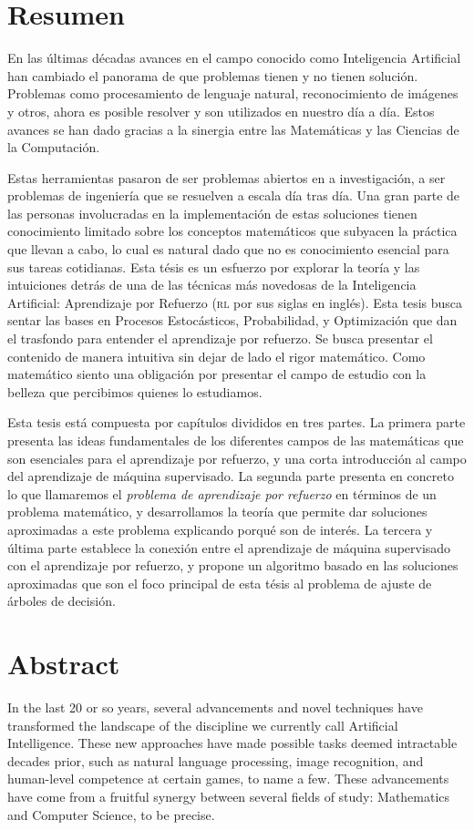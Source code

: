 
\chapter*{Resumen}
En las últimas décadas avances en el campo conocido como Inteligencia Artificial
han cambiado el panorama de que problemas tienen y no tienen solución. Problemas
como procesamiento de lenguaje natural, reconocimiento de imágenes y otros,
ahora es posible resolver y son utilizados en nuestro día a día. Estos avances
se han dado gracias a la sinergia entre las Matemáticas y las Ciencias de la
Computación.

Estas herramientas pasaron de ser problemas abiertos en a investigación, a ser
problemas de ingeniería que se resuelven a escala día tras día. Una gran parte
de las personas involucradas en la implementación de estas soluciones tienen
conocimiento limitado sobre los conceptos matemáticos que subyacen la práctica
que llevan a cabo, lo cual es natural dado que no es conocimiento esencial para
sus tareas cotidianas. Esta tésis es un esfuerzo por explorar la teoría y las
intuiciones detrás de una de las técnicas más novedosas de la Inteligencia
Artificial: Aprendizaje por Refuerzo (\textsc{rl} por sus siglas en inglés).
Esta tesis busca sentar las bases en Procesos Estocásticos, Probabilidad, y
Optimización que dan el trasfondo para entender el aprendizaje por refuerzo. Se
busca presentar el contenido de manera intuitiva sin dejar de lado el rigor
matemático. Como matemático siento una obligación por presentar el campo de
estudio con la belleza que percibimos quienes lo estudiamos.

Esta tesis está compuesta por capítulos divididos en tres partes. La primera
parte presenta las ideas fundamentales de los diferentes campos de las
matemáticas que son esenciales para el aprendizaje por refuerzo, y una corta
introducción al campo del aprendizaje de máquina supervisado. La segunda parte
presenta en concreto lo que llamaremos el \emph{problema de aprendizaje por
refuerzo} en términos de un problema matemático, y desarrollamos la teoría que
permite dar soluciones aproximadas a este problema explicando porqué son de
interés. La tercera y última parte establece la conexión entre el aprendizaje de
máquina supervisado con el aprendizaje por refuerzo, y propone un algoritmo
basado en las soluciones aproximadas que son el foco principal de esta tésis al
problema de ajuste de árboles de decisión.

\chapter*{Abstract}
In the last 20 or so years, several advancements and novel techniques have
transformed the landscape of the discipline we currently call Artificial
Intelligence. These new approaches have made possible tasks deemed intractable
decades prior, such as natural language processing, image recognition, and
human-level competence at certain games, to name a few. These advancements have
come from a fruitful synergy between several fields of study: Mathematics and
Computer Science, to be precise.

